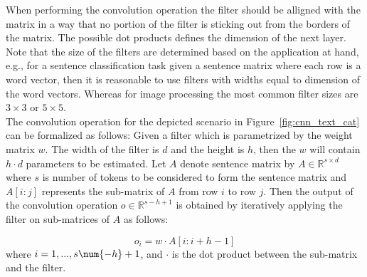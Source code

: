 When performing the convolution operation the filter should be alligned with the matrix in a way that no portion of the filter is sticking out from the borders of the matrix. The possible dot products defines the dimension of the next layer. Note that the size of the filters are determined based on the application at hand, e.g., for a sentence classification task given a sentence matrix where each row is a word vector, then it is reasonable to use filters with widths equal to dimension of the word vectors. Whereas for image processing the most common filter sizes are $3\times 3$ or $5\times 5$.  \\
The convolution operation for the depicted scenario in Figure~\ref{fig:cnn_text_cat} can be formalized as follows:
Given a filter which is parametrized by the weight matrix $w$. The width of the filter is $d$ and the height is $h$, then the $w$ will contain $h \cdot d$ parameters to be estimated. Let $A$ denote sentence matrix by $A \in \mathbb{R}^{s\times d}$ where $s$ is number of tokens to be considered to form the sentence matrix and $A[i:j]$ represents the sub-matrix of $A$ from row $i$ to row $j$. Then the output of the convolution operation $o\in \mathbb{R}^{s-h+1}$ is obtained by iteratively applying the filter on sub-matrices of $A$ as follows:

\begin{equation}
o_i = w \cdot A \left[i:i + h -1\right]
\end{equation}
where $i = 1,. . ., s\num{-h}+1$, and $\cdot$ is the dot product between the sub-matrix and the filter. \\




